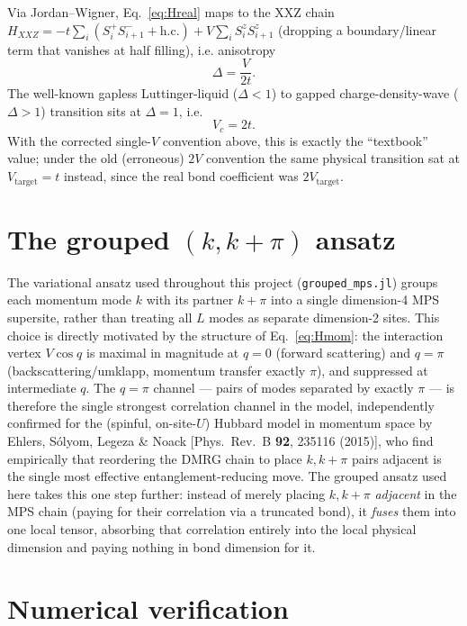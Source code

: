 \documentclass[11pt]{article}
\begin{document}
Via Jordan--Wigner, Eq.~\eqref{eq:Hreal} maps to the XXZ chain
$H_{XXZ} = -t\sum_i (S_i^+S_{i+1}^- + \mathrm{h.c.}) + V\sum_i S_i^zS_{i+1}^z$
(dropping a boundary/linear term that vanishes at half filling), i.e.
anisotropy
\begin{equation}
\Delta = \frac{V}{2t}.
\end{equation}
The well-known gapless Luttinger-liquid ($\Delta<1$) to gapped
charge-density-wave ($\Delta>1$) transition sits at $\Delta=1$, i.e.
\begin{equation}
\boxed{V_c = 2t.}
\end{equation}
With the corrected single-$V$ convention above, this is exactly the
``textbook'' value; under the old (erroneous) $2V$ convention the same
physical transition sat at $V_{\text{target}}=t$ instead, since the real
bond coefficient was $2V_{\text{target}}$.

\section{The grouped $(k,k{+}\pi)$ ansatz}

The variational ansatz used throughout this project (\texttt{grouped\_mps.jl})
groups each momentum mode $k$ with its partner $k+\pi$ into a single
dimension-4 MPS supersite, rather than treating all $L$ modes as separate
dimension-2 sites. This choice is directly motivated by the structure of
Eq.~\eqref{eq:Hmom}: the interaction vertex $V\cos q$ is maximal in
magnitude at $q=0$ (forward scattering) and $q=\pi$ (backscattering/umklapp,
momentum transfer exactly $\pi$), and suppressed at intermediate $q$. The
$q=\pi$ channel — pairs of modes separated by exactly $\pi$ — is therefore
the single strongest correlation channel in the model, independently
confirmed for the (spinful, on-site-$U$) Hubbard model in momentum space by
Ehlers, S\'olyom, Legeza \& Noack [Phys.\ Rev.\ B \textbf{92}, 235116
(2015)], who find empirically that reordering the DMRG chain to place
$k,k+\pi$ pairs adjacent is the single most effective entanglement-reducing
move. The grouped ansatz used here takes this one step further: instead of
merely placing $k,k+\pi$ \emph{adjacent} in the MPS chain (paying for their
correlation via a truncated bond), it \emph{fuses} them into one local
tensor, absorbing that correlation entirely into the local physical
dimension and paying nothing in bond dimension for it.

\section{Numerical verification}
\end{document}
